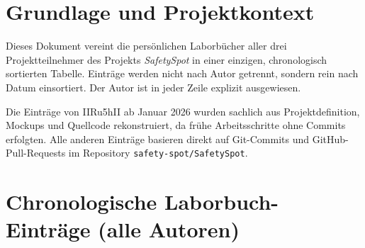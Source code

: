 
\maketitle
\setcounter{section}{0}

\section{Grundlage und Projektkontext}

Dieses Dokument vereint die persönlichen Laborbücher aller drei Projektteilnehmer
des Projekts \emph{SafetySpot} in einer einzigen, chronologisch sortierten Tabelle.
Einträge werden nicht nach Autor getrennt, sondern rein nach Datum einsortiert.
Der Autor ist in jeder Zeile explizit ausgewiesen.

Die Einträge von IIRu5hII ab Januar 2026 wurden sachlich aus Projektdefinition,
Mockups und Quellcode rekonstruiert, da frühe Arbeitsschritte ohne Commits erfolgten.
Alle anderen Einträge basieren direkt auf Git-Commits und GitHub-Pull-Requests im
Repository \texttt{safety-spot/SafetySpot}.

\section{Chronologische Laborbuch-Einträge (alle Autoren)}

